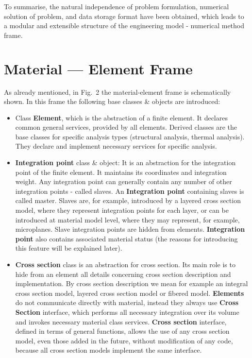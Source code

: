 \documentclass[a4paper]{article}
\newcommand{\class}[1]{{\bf #1}}
\begin{document}
To summarise, the natural independence of  problem formulation,
numerical solution of  problem, and data storage format have been
obtained, which leads to a modular and extensible structure of the engineering
model - numerical method frame.



\section{Material --- Element Frame}
\label{materialEleemntFrame}
As already mentioned, in Fig.~2 the material-element
frame is schematically shown.
In this frame the following base classes \&
objects are introduced:


\begin{itemize}
\item
Class \class{Element}, which is the abstraction of a finite element. It declares
common general services, provided by all elements. Derived
classes are the base classes for specific analysis types (structural
analysis, thermal analysis).  They declare and implement necessary services for
specific analysis.

\item
\class{Integration point} class \& object: It is an abstraction for
the integration
point of the finite element. It maintains its coordinates and integration
weight. Any integration point can generally contain any number of
other integration points - called slaves. An \class{Integration
point} containing slaves is called master. Slaves are, for example,
introduced by a layered cross section model, where they represent
integration points for each layer, or can be introduced at material
model level, where they may represent, for example, microplanes. Slave
integration points are hidden from elements. \class{Integration point}
also contains associated material status (the reasons for introducing
this feature will be explained later).

\item
\class{Cross section} class is an abstraction for cross section. Its
main role is to hide from an element all details concerning cross
section description and implementation. By cross section description
we mean for example an integral cross section model, layered cross
section model or fibered model. \class{Elements} do not communicate directly
with material, instead they always use \class{Cross Section} interface, which
performs all necessary integration over its volume and invokes
necessary material class services. \class{Cross section} interface, defined in
terms of general functions, allows the use of any cross section
model, even those added in the future, without modification of any code,
because all cross section models implement the same interface.



\end{itemize}
\end{document}
